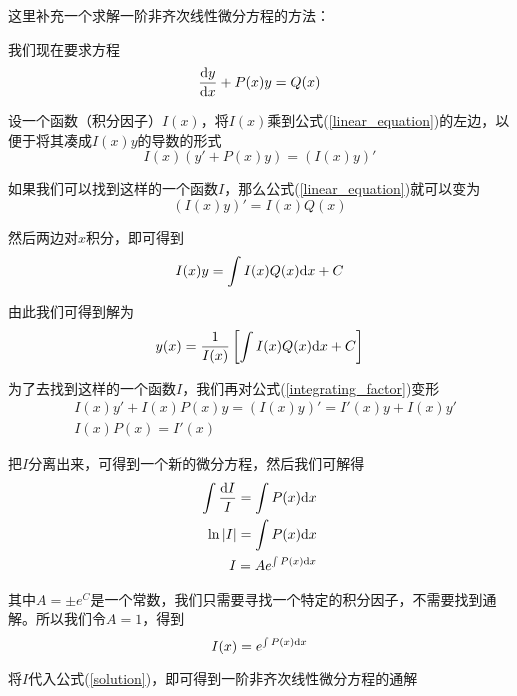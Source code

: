 \begin{note}
    这里补充一个求解一阶非齐次线性微分方程的方法：

    我们现在要求方程
    \begin{equation}
        \dfrac{\mathrm{d} y}{\mathrm{d} x}+P(x)y=Q(x) \label{linear_equation}
    \end{equation}

    设一个函数（积分因子）$I(x)$，将$I(x)$乘到公式(\ref{linear_equation})的左边，以便于将其凑成$I(x)y$的导数的形式
    \begin{equation}
        I(x)(y'+P(x)y)=(I(x)y)' \label{integrating_factor}
    \end{equation}

    如果我们可以找到这样的一个函数$I$，那么公式(\ref{linear_equation})就可以变为
    \begin{equation*}
        (I(x)y)'=I(x)Q(x)
    \end{equation*}

    然后两边对$x$积分，即可得到
    \begin{equation*}
        I(x)y=\int I(x)Q(x)\mathrm{d} x+C
    \end{equation*}

    由此我们可得到解为
    \begin{equation}
        y(x)=\dfrac{1}{I(x)}\left[\int I(x)Q(x)\mathrm{d} x+C\right] \label{solution}
    \end{equation}

    为了去找到这样的一个函数$I$，我们再对公式(\ref{integrating_factor})变形
    \begin{align*}
        & I(x)y'+I(x)P(x)y=(I(x)y)'=I'(x)y+I(x)y' \\
        & I(x)P(x)=I'(x)
    \end{align*}

    把$I$分离出来，可得到一个新的微分方程，然后我们可解得
    \begin{align*}
        \int\dfrac{\mathrm{d} I}{I}=\int P(x)\mathrm{d} x \\
        \ln |I|=\int P(x)\mathrm{d} x \\
        I=Ae^{\int P(x)\mathrm{d} x}
    \end{align*}

    其中$A=\pm e^C$是一个常数，我们只需要寻找一个特定的积分因子，不需要找到通解。所以我们令$A=1$，得到
    \begin{equation*}
        I(x)=e^{\int P(x)\mathrm{d} x}
    \end{equation*}

    将$I$代入公式(\ref{solution})，即可得到一阶非齐次线性微分方程的通解
\end{note}


